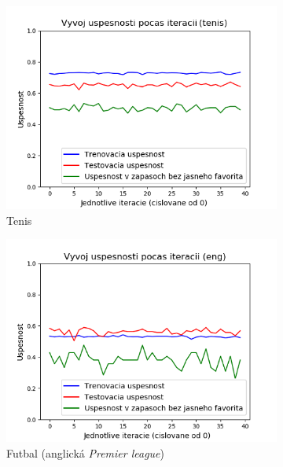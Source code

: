 \noindent
\begin{figure}[h!]
  \begin{subfigure}[b]{0.48\linewidth}
    \includegraphics[width=\linewidth]{../img/ffnn_tenis_res.png} 
    \caption{Tenis} 
  \end{subfigure} 
  \begin{subfigure}[b]{0.48\linewidth}
    \includegraphics[width=\linewidth]{../img/ffnn_eng_res.png} 
    \caption{Futbal (anglická \textit{Premier league})} 
  \end{subfigure} 
  \begin{subfigure}[b]{0.48\linewidth}

\end{subfigure}
\end{figure}

